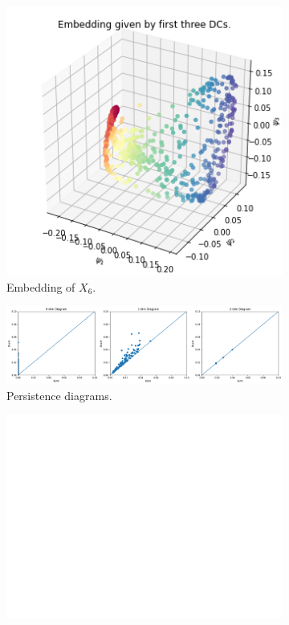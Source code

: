 \begin{figure}[H]
\centering
\begin{subfigure}[b]{0.2\textwidth}
    \includegraphics[width=\textwidth]{figures/topology/X6_embedding.png}
    \caption{Embedding of  $X_6$.}
\end{subfigure}
\hfill
\begin{subfigure}[b]{0.75\textwidth}
    \includegraphics[width=\textwidth]{figures/topology/X6_H0.png}
    \caption{Persistence diagrams.}
\end{subfigure}
\begin{subfigure}[b]{0.25\textwidth}
\includegraphics[width=\textwidth]{figures/topology/white.png} 

\end{subfigure}
\end{figure}
